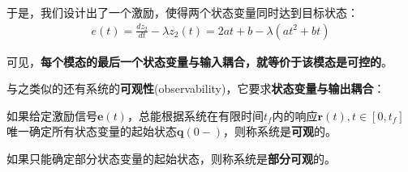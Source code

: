 \begin{example}
    于是，我们设计出了一个激励，使得两个状态变量同时达到目标状态：\begin{align*}
        e(t)=\frac{d z_2}{dt}-\lambda z_2(t)=2at+b-\lambda (a t^2+bt)
    \end{align*}
\end{example}

可见，\textbf{每个模态的最后一个状态变量与输入耦合，就等价于该模态是可控的}。

与之类似的还有系统的\textbf{可观性}(observability)，它要求\textbf{状态变量与输出耦合}：

\begin{definition}[可观性]
    如果给定激励信号$\mathbf{e}(t)$，总能根据系统在有限时间$t_f$内的响应$\mathbf{r}(t),t\in[0,t_f]$唯一确定所有状态变量的起始状态$\mathbf{q}(0-)$，则称系统是\textbf{可观}的。

    如果只能确定部分状态变量的起始状态，则称系统是\textbf{部分可观}的。
\end{definition}

